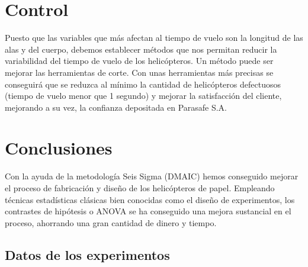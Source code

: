 \documentclass[12pt,a4paper,twoside,openright,titlepage,final]{article}
\begin{document}
\section{Control}

Puesto que las variables que más afectan al tiempo de vuelo son la longitud de las alas y del cuerpo, debemos establecer métodos que nos permitan reducir la variabilidad del tiempo de vuelo de los helicópteros. Un método puede ser mejorar las herramientas de corte. Con unas herramientas más precisas se conseguirá que se reduzca al mínimo la cantidad de helicópteros defectuosos (tiempo de vuelo menor que 1 segundo) y mejorar la satisfacción del cliente, mejorando a su vez, la confianza depositada en Parasafe S.A. 

\section{Conclusiones}

Con la ayuda de la metodología Seis Sigma (DMAIC) hemos conseguido mejorar el proceso de fabricación y diseño de los helicópteros de papel. Empleando técnicas estadísticas clásicas bien conocidas como el diseño de experimentos, los contrastes de hipótesis o ANOVA se ha conseguido una mejora sustancial en el proceso, ahorrando una gran cantidad de dinero y tiempo.

%
%

\begin{appendices}
	\section{Datos de los experimentos} \label{chp:experimentos}
\end{appendices}
\end{document}
